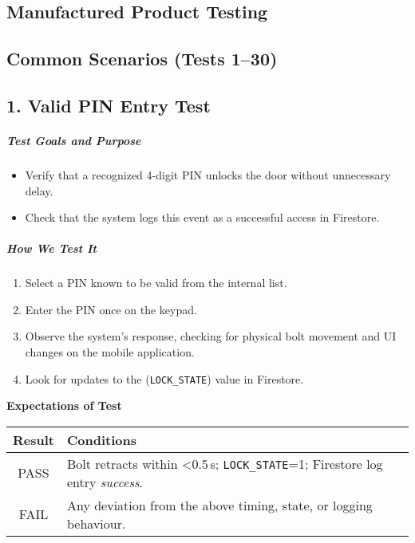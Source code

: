 \newpage
\begin{samepage}
    \section{Manufactured Product Testing}
    \subsection{Common Scenarios (Tests 1–30)}
    \subsection*{1. Valid PIN Entry Test}
    \subparagraph{Test Goals and Purpose}
    \begin{itemize}
        \item Verify that a recognized 4-digit PIN unlocks the door without unnecessary delay.
        \item Check that the system logs this event as a successful access in Firestore.
    \end{itemize}
    \subparagraph{How We Test It}
    \begin{enumerate}
        \item Select a PIN known to be valid from the internal list.
        \item Enter the PIN once on the keypad.
        \item Observe the system's response, checking for physical bolt movement and UI changes on the mobile application.
        \item Look for updates to the (\texttt{LOCK\_STATE}) value in Firestore.
    \end{enumerate}
    
    \textbf{Expectations of Test}
    \begin{center}
    \begin{tabular}{|c|p{10cm}|}
      \hline
      \textbf{Result} & \textbf{Conditions} \\
      \hline
      PASS & Bolt retracts within \textless{}0.5\,s; \texttt{LOCK\_STATE}=1; Firestore log entry \emph{success}. \\
      \hline
      FAIL & Any deviation from the above timing, state, or logging behaviour. \\
      \hline
    \end{tabular}
    \end{center}
\end{samepage}


